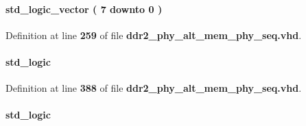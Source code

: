 \paragraph[{cal\+\_\+codvw\+\_\+size}]{ {\bfseries \textcolor{comment}{std\+\_\+logic\+\_\+vector}\textcolor{vhdlchar}{ }\textcolor{vhdlchar}{(}\textcolor{vhdlchar}{ }\textcolor{vhdlchar}{ } \textcolor{vhdldigit}{7} \textcolor{vhdlchar}{ }\textcolor{keywordflow}{downto}\textcolor{vhdlchar}{ }\textcolor{vhdlchar}{ } \textcolor{vhdldigit}{0} \textcolor{vhdlchar}{ }\textcolor{vhdlchar}{)}\textcolor{vhdlchar}{ }} \hspace{0.3cm}{\ttfamily [Record]}}\label{classddr2__phy__alt__mem__phy__record__pkg_afa6ffd6571ce4391077adf571f06cb72}


Definition at line {\bf 259} of file {\bf ddr2\+\_\+phy\+\_\+alt\+\_\+mem\+\_\+phy\+\_\+seq.\+vhd}.

\paragraph[{cal\+\_\+dis}]{ {\bfseries \textcolor{comment}{std\+\_\+logic}\textcolor{vhdlchar}{ }} \hspace{0.3cm}{\ttfamily [Record]}}\label{classddr2__phy__alt__mem__phy__record__pkg_ac1342a16cc13a5eeeca1195acc318afd}


Definition at line {\bf 388} of file {\bf ddr2\+\_\+phy\+\_\+alt\+\_\+mem\+\_\+phy\+\_\+seq.\+vhd}.

\paragraph[{calibration\+\_\+start}]{ {\bfseries \textcolor{comment}{std\+\_\+logic}\textcolor{vhdlchar}{ }} \hspace{0.3cm}{\ttfamily [Record]}}\label{classddr2__phy__alt__mem__phy__record__pkg_a4c902f193a8ad38ba62cf98f09d053dc}


